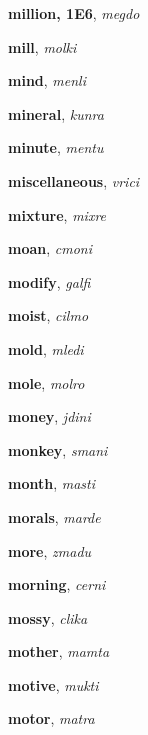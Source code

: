 \documentclass[12pt]{book}
\begin{document}
\begin{description}
\item[ ] \textbf{million, 1E6}, \textit{megdo}

\item[ ] \textbf{mill}, \textit{molki}

\item[ ] \textbf{mind}, \textit{menli}

\item[ ] \textbf{mineral}, \textit{kunra}

\item[ ] \textbf{minute}, \textit{mentu}

\item[ ] \textbf{miscellaneous}, \textit{vrici}

\item[ ] \textbf{mixture}, \textit{mixre}

\item[ ] \textbf{moan}, \textit{cmoni}

\item[ ] \textbf{modify}, \textit{galfi}

\item[ ] \textbf{moist}, \textit{cilmo}

\item[ ] \textbf{mold}, \textit{mledi}

\item[ ] \textbf{mole}, \textit{molro}

\item[ ] \textbf{money}, \textit{jdini}

\item[ ] \textbf{monkey}, \textit{smani}

\item[ ] \textbf{month}, \textit{masti}

\item[ ] \textbf{morals}, \textit{marde}

\item[ ] \textbf{more}, \textit{zmadu}

\item[ ] \textbf{morning}, \textit{cerni}

\item[ ] \textbf{mossy}, \textit{clika}

\item[ ] \textbf{mother}, \textit{mamta}

\item[ ] \textbf{motive}, \textit{mukti}

\item[ ] \textbf{motor}, \textit{matra}


\end{description}
\end{document}
